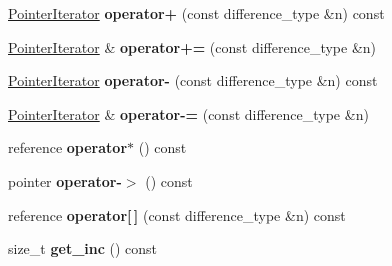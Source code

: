 \begin{DoxyCompactItemize}
\item 
\hypertarget{classkeycpp_1_1_pointer_iterator_a93d3314a1e2896d39b87fce1c79cf3c0}{\hyperlink{classkeycpp_1_1_pointer_iterator}{Pointer\-Iterator} {\bfseries operator+} (const difference\-\_\-type \&n) const }\label{classkeycpp_1_1_pointer_iterator_a93d3314a1e2896d39b87fce1c79cf3c0}

\item 
\hypertarget{classkeycpp_1_1_pointer_iterator_a3cc779696b1e9b2c9aff80608ade1fce}{\hyperlink{classkeycpp_1_1_pointer_iterator}{Pointer\-Iterator} \& {\bfseries operator+=} (const difference\-\_\-type \&n)}\label{classkeycpp_1_1_pointer_iterator_a3cc779696b1e9b2c9aff80608ade1fce}

\item 
\hypertarget{classkeycpp_1_1_pointer_iterator_a30dbe9e2a35428de230bc91989ef36dd}{\hyperlink{classkeycpp_1_1_pointer_iterator}{Pointer\-Iterator} {\bfseries operator-\/} (const difference\-\_\-type \&n) const }\label{classkeycpp_1_1_pointer_iterator_a30dbe9e2a35428de230bc91989ef36dd}

\item 
\hypertarget{classkeycpp_1_1_pointer_iterator_a070e0ded5d9a1e27a81beef460e56dc1}{\hyperlink{classkeycpp_1_1_pointer_iterator}{Pointer\-Iterator} \& {\bfseries operator-\/=} (const difference\-\_\-type \&n)}\label{classkeycpp_1_1_pointer_iterator_a070e0ded5d9a1e27a81beef460e56dc1}

\item 
\hypertarget{classkeycpp_1_1_pointer_iterator_a8f90f761a85a25dc17e6c4c1a3d395c9}{reference {\bfseries operator$\ast$} () const }\label{classkeycpp_1_1_pointer_iterator_a8f90f761a85a25dc17e6c4c1a3d395c9}

\item 
\hypertarget{classkeycpp_1_1_pointer_iterator_ae43cd45245f9d970256e1b3f021f3d53}{pointer {\bfseries operator-\/$>$} () const }\label{classkeycpp_1_1_pointer_iterator_ae43cd45245f9d970256e1b3f021f3d53}

\item 
\hypertarget{classkeycpp_1_1_pointer_iterator_a390b37fc74ce6893512e8a02c4fea83d}{reference {\bfseries operator\mbox{[}$\,$\mbox{]}} (const difference\-\_\-type \&n) const }\label{classkeycpp_1_1_pointer_iterator_a390b37fc74ce6893512e8a02c4fea83d}

\item 
\hypertarget{classkeycpp_1_1_pointer_iterator_a52500cdd636c14af6f85196b1cae8a44}{size\-\_\-t {\bfseries get\-\_\-inc} () const }\label{classkeycpp_1_1_pointer_iterator_a52500cdd636c14af6f85196b1cae8a44}

\end{DoxyCompactItemize}
